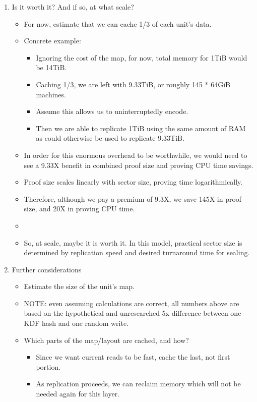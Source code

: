 \documentclass[11pt]{article}
\begin{document}
\begin{enumerate}
\begin{enumerate}
\begin{itemize}
\end{itemize}
\item Is it worth it? And if so, at what scale?
\label{sec-1-3-1-3-4}
\begin{itemize}
\item For now, estimate that we can cache 1/3 of each unit's data.
\item Concrete example:
\begin{itemize}
\item Ignoring the cost of the map, for now, total memory for 1TiB would be 14TiB.
\item Caching 1/3, we are left with 9.33TiB, or roughly 145 * 64GiB machines.
\item Assume this allows us to uninterruptedly encode.
\item Then we are able to replicate 1TiB using the same amount of RAM as could otherwise be used to replicate 9.33TiB.
\end{itemize}
\item In order for this enormous overhead to be worthwhile, we would need to see a 9.33X benefit in combined proof size and proving CPU time savings.
\item Proof size scales linearly with sector size, proving time logarithmically.
\item Therefore, although we pay a premium of 9.3X, we save 145X in proof size, and 20X in proving CPU time.
\item{}
\item So, at scale, maybe it is worth it. In this model, practical sector size is determined by replication speed and desired turnaround time for sealing.
\end{itemize}
\item Further considerations
\label{sec-1-3-1-3-5}
\begin{itemize}
\item Estimate the size of the unit's map.
\item NOTE: even assuming calculations are correct, all numbers above are based on the hypothetical and unresearched 5x difference between one KDF hash and one random write.
\item Which parts of the map/layout are cached, and how?
\begin{itemize}
\item Since we want current reads to be fast, cache the last, not first portion.
\item As replication proceeds, we can reclaim memory which will not be needed again for this layer.

\end{itemize}
\end{itemize}
\end{enumerate}
\end{enumerate}
\end{document}
